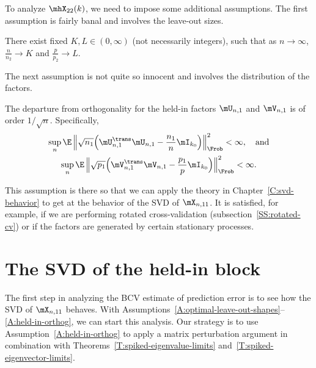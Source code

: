 To analyze $\mhX_{22}(k)$, we need to impose some additional assumptions.
The first assumption is fairly banal and involves the leave-out sizes.

\begin{assumption}
    There exist fixed $K, L \in (0, \infty)$ (not necessarily integers),
    such that as $n \to \infty$,
    $\frac{n}{n_2} \to K$ and $\frac{p}{p_2} \to L$.
\end{assumption}

\noindent
The next assumption is not quite so innocent and involves the distribution of the factors.

\begin{assumption}\label{A:held-in-orthog}
    The departure from orthogonality for the held-in factors $\mU_{n,1}$
    and $\mV_{n,1}$ is of order $1/\sqrt{n}$.  Specifically,
    \begin{gather*}
        \sup_n 
        \E \, \Big\| 
            \sqrt{n_1} 
            \Big( 
                \mU_{n,1}^\trans \mU_{n,1} 
                -
                \frac{n_1}{n} \mI_{k_0}
            \Big)
        \Big\|_\Frob^2
        <
        \infty, \quad\text{and} \\
        \sup_n
        \E \, \Big\| 
            \sqrt{p_1} 
            \Big( 
                \mV_{n,1}^\trans \mV_{n,1} 
                -
                \frac{p_1}{p} \mI_{k_0}
            \Big)
        \Big\|_\Frob^2
        <
        \infty.
    \end{gather*}
\end{assumption}

\noindent
This assumption is there so that we can apply the theory in Chapter~\ref{C:svd-behavior} to get at the behavior of the SVD of $\mX_{n,11}$.  It is satisfied, for example, if we are performing rotated cross-validation (subsection~\ref{SS:rotated-cv}) or if the factors are generated by certain stationary processes.


\section{The SVD of the held-in block}

The first step in analyzing the BCV estimate of prediction error is to see how the SVD of $\mX_{n,11}$ behaves.  With Assumptions~\ref{A:optimal-leave-out-shapes}--\ref{A:held-in-orthog}, we can start this analysis.  Our strategy is to use Assumption~\ref{A:held-in-orthog} to apply a matrix perturbation argument in combination with Theorems~\ref{T:spiked-eigenvalue-limits} and~\ref{T:spiked-eigenvector-limits}.

